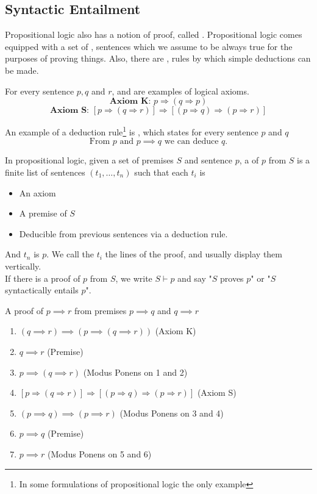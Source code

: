 \documentclass[11pt]{article}
\begin{document}
\subsection{Syntactic Entailment}
Propositional logic also has a notion of proof, called . Propositional logic comes equipped with a set of , sentences which we assume to be always true for the purposes of proving things. Also, there are , rules by which simple deductions can be made.
\begin{eg}
    For every sentence $p,q$ and $r$,  and  are examples of logical axioms. 
    \[\textbf{Axiom K: } p \Rightarrow (q \Rightarrow p)\]
    \[\textbf{Axiom S: }[p \Rightarrow (q \Rightarrow r)] \Rightarrow [(p \Rightarrow q) \Rightarrow (p \Rightarrow r)]\]
\end{eg}
\begin{eg}
    An example of a deduction rule\footnote{In some formulations of propositional logic the only example} is , which states for every sentence $p$ and $q$
    \[\text{From } p \text{ and } p \implies q \text{ we can deduce } q. \]
\end{eg}
\begin{defi}[Proof]
    In propositional logic, given a set of premises $S$ and sentence $p$, a  of $p$ from $S$ is a finite  list of sentences $(t_1, \dots, t_n)$ such that each $t_i$ is 
    \begin{itemize}
        \item An axiom
        \item A premise of $S$
        \item Deducible from previous sentences via a deduction rule.
    \end{itemize}
    And $t_n$ is $p$. We call the $t_i$ the lines of the proof, and usually display them vertically.
    \\If there is a proof of $p$ from $S$, we write $S \vdash p$ and say "$S$ proves $p$" or "$S$ syntactically entails $p$".
\end{defi}
\begin{eg} A proof of $p \implies r$ from premises $p \implies q$ and $q \implies r$
\begin{enumerate}
    \item $(q \implies r) \implies (p \implies (q \implies r))$ \hfill (Axiom K)
    \item $q \implies r$ \hfill (Premise)
    \item $p \implies (q \implies r)$ \hfill (Modus Ponens on 1 and 2)
    \item $[p \Rightarrow (q \Rightarrow r)] \Rightarrow [(p \Rightarrow q) \Rightarrow (p \Rightarrow r)]$ \hfill (Axiom S)
    \item $(p \implies q) \implies (p \implies r)$ \hfill (Modus Ponens on 3 and 4)
    \item $p \implies q$ \hfill (Premise)
    \item $p \implies r$ \hfill (Modus Ponens on 5 and 6)
\end{enumerate}
\end{eg}
\end{document}

